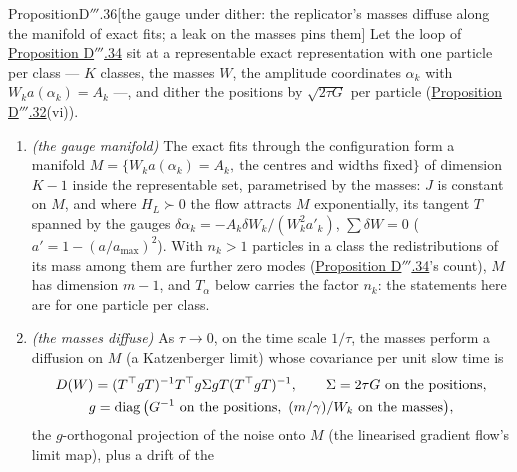 \begin{thm}{Proposition}{D$'''$.36}[the gauge under dither: the replicator's masses diffuse along the manifold of exact
fits; a leak on the masses pins them]\label{res:thmDppp:36}%
Let the loop of \hyperref[res:thmDppp:34]{Proposition D$'''$.34} sit at a representable exact representation with one
particle per class --- $K$ classes, the masses $W$, the amplitude coordinates $\alpha_k$ with $W_ka(\alpha_k) = A_k$ ---,
and dither the positions by $\sqrt{2\tau G}$ per particle (\hyperref[res:thmDppp:32]{Proposition D$'''$.32}(vi)).
\begin{enumerate}[label=\textup{(\roman*)}]
  \item \emph{(the gauge manifold)} The exact fits through the configuration form a manifold
    $M = \{W_ka(\alpha_k) = A_k,\ \text{the centres and widths fixed}\}$ of dimension $K - 1$ inside the representable
    set, parametrised by the masses: $J$ is constant on $M$, and where $H_L\succ0$ the flow attracts $M$
    exponentially, its tangent $T$ spanned by the gauges $\delta\alpha_k = -A_k\delta W_k/(W_k^2a'_k)$,
    $\sum\delta W = 0$ ($a' = 1 - (a/a_{\max})^2$). With $n_k > 1$ particles in a class the redistributions of its
    mass among them are further zero modes (\hyperref[res:thmDppp:34]{Proposition D$'''$.34}'s count), $M$ has
    dimension $m - 1$, and $T_\alpha$ below carries the factor $n_k$: the statements here are for one particle per
    class.
  \item \emph{(the masses diffuse)} As $\tau\to0$, on the time scale $1/\tau$, the masses perform a diffusion on $M$
    (a Katzenberger limit) whose covariance per unit slow time is
    \begin{gather*}
      D(W) = (T^\T gT)^{-1}T^\T g\Sigma gT(T^\T gT)^{-1},\qquad
      \Sigma = 2\tau G\ \text{on the positions},\\
      g = \operatorname{diag}\big(G^{-1}\ \text{on the positions},\ (m/\gamma)/W_k\ \text{on the masses}\big),
    \end{gather*}
    the $g$-orthogonal projection of the noise onto $M$ (the linearised gradient flow's limit map), plus a drift of the

\end{enumerate}
\end{thm}
